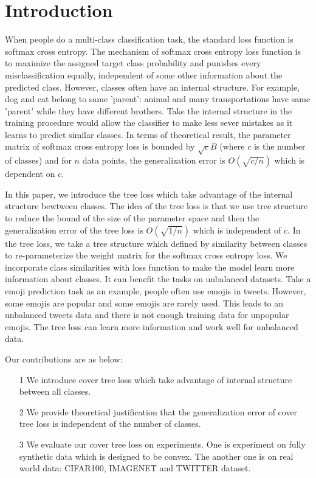\documentclass[twoside]{article}
\theoremstyle{definition}
\begin{document}
\section{Introduction}

When people do a multi-class classification task, the standard loss function is softmax cross entropy.
The mechanism of softmax cross entropy loss function is to maximize the assigned target class probability and punishes every misclassification equally, independent of some other information about the predicted class.
However, classes often have an internal structure. 
For example, dog and cat belong to same 'parent': animal and many transportations have same 'parent' while they have different brothers. Take the internal structure in the training procedure would allow the classifier to make less sever mistakes as it learns to predict similar classes.
In terms of theoretical result, the parameter matrix of softmax cross entropy loss is bounded by $\sqrt{c}B$ (where $c$ is the number of classes) and for $n$ data points, the generalization error is $O(\sqrt{c/n})$ which is dependent on $c$.

In this paper, we introduce the tree loss which take advantage of the internal structure bewtween classes.
The idea of the tree loss is that we use tree structure to reduce the bound of the size of the parameter space and then the generalization error of the tree loss is $O(\sqrt{1/n})$ which is independent of $c$.
In the tree loss, we take a tree structure which defined by similarity between classes to re-parameterize the weight matrix for the softmax cross entropy loss.
We incorporate class similarities with loss function to make the model learn more information about classes.
It can benefit the tasks on unbalanced datasets.
Take a emoji prediction task as an example, people often use emojis in tweets.
However, some emojis are popular and some emojis are rarely used.
This leads to an unbalanced tweets data and there is not enough training data for unpopular emojis.
The tree loss can learn more information and work well for unbalanced data.


Our contributions are as below:
\begin{itemize}
    \item [1] 
    We introduce cover tree loss which take advantage of internal structure between all classes.
    \item [2] 
    We provide theoretical justification that the generalization error of cover tree loss is independent of the number of classes.
    \item [3]
    We evaluate our cover tree loss on experiments. One is experiment on fully synthetic data which is designed to be convex. The another one is on real world data: CIFAR100, IMAGENET and TWITTER dataset. 
    
\end{itemize}
\end{document}
